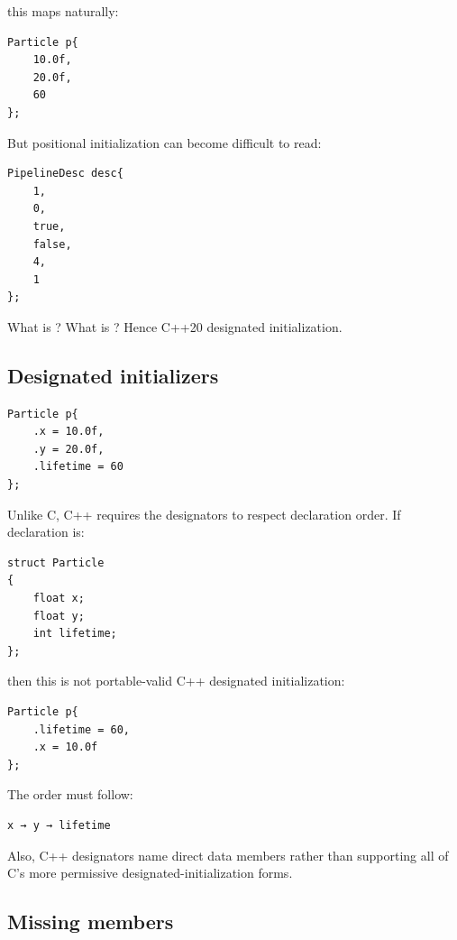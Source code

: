 this maps naturally:

\begin{verbatim}
Particle p{
    10.0f,
    20.0f,
    60
};
\end{verbatim}

But positional initialization can become difficult to read:

\begin{verbatim}
PipelineDesc desc{
    1,
    0,
    true,
    false,
    4,
    1
};
\end{verbatim}

What is ? What is ? Hence C++20 designated initialization.

\subsection{Designated initializers}\label{05-engine-i-ch003-designated-initializers}

\hypertarget{05-engine-i-ch003-designated-initializers}{}

\begin{verbatim}
Particle p{
    .x = 10.0f,
    .y = 20.0f,
    .lifetime = 60
};
\end{verbatim}

Unlike C, C++ requires the designators to respect declaration order. If declaration is:

\begin{verbatim}
struct Particle
{
    float x;
    float y;
    int lifetime;
};
\end{verbatim}

then this is not portable-valid C++ designated initialization:

\begin{verbatim}
Particle p{
    .lifetime = 60,
    .x = 10.0f
};
\end{verbatim}

The order must follow:

\begin{verbatim}
x → y → lifetime
\end{verbatim}

Also, C++ designators name direct data members rather than supporting all of C's more permissive designated-initialization forms.

\subsection{Missing members}\label{05-engine-i-ch003-missing-members}

